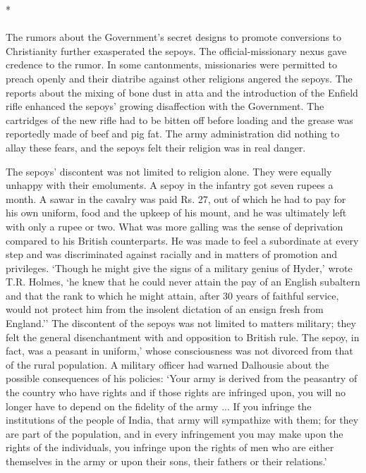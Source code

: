 \begin{center}*\end{center}

\paragraph*{}
The rumors about the Government's secret designs to promote conversions to Christianity further exasperated the sepoys. The official-missionary nexus gave credence to the rumor. In some cantonments, missionaries were permitted to preach openly and their diatribe against other religions angered the sepoys. The reports about the mixing of bone dust in atta and the introduction of the Enfield rifle enhanced the sepoys' growing disaffection with the Government. The cartridges of the new rifle had to be bitten off before loading and the grease was reportedly made of beef and pig fat. The army administration did nothing to allay these fears, and the sepoys felt their religion was in real danger.

The sepoys' discontent was not limited to religion alone. They were equally unhappy with their emoluments. A sepoy in the infantry got seven rupees a month. A sawar in the cavalry was paid Rs. 27, out of which he had to pay for his own uniform, food and the upkeep of his mount, and he was ultimately left with only a rupee or two. What was more galling was the sense of deprivation compared to his British counterparts. He was made to feel a subordinate at every step and was discriminated against racially and in matters of promotion and privileges. `Though he might give the signs of a military genius of Hyder,' wrote T.R. Holmes, `he knew that he could never attain the pay of an English subaltern and that the rank to which he might attain, after 30 years of faithful service, would not protect him from the insolent dictation of an ensign fresh from England.'' The discontent of the sepoys was not limited to matters military; they felt the general disenchantment with and opposition to British rule. The sepoy, in fact, was a peasant in uniform,' whose consciousness was not divorced from that of the rural population. A military officer had warned Dalhousie about the possible consequences of his policies: `Your army is derived from the peasantry of the country who have rights and if those rights are infringed upon, you will no longer have to depend on the fidelity of the army ... If you infringe the institutions of the people of India, that army will sympathize with them; for they are part of the population, and in every infringement you may make upon the rights of the individuals, you infringe upon the rights of men who are either themselves in the army or upon their sons, their fathers or their relations.'

